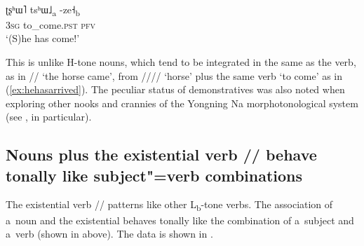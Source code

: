 \begin{exe}
	\ex
	\label{ex:hehasarrived}
	\\
	\gll ʈʂʰɯ˥ 	tsʰɯ˩\textsubscript{a}		-ze˧\textsubscript{b}\\
	3\textsc{sg}		to\_come.\textsc{pst}	\textsc{pfv}\\
	\glt ‘(S)he has come!’
\end{exe}

This is unlike H-tone nouns, which tend to be integrated in the same  as the verb, as in // ‘the horse came’, from //// ‘horse’ plus the same verb ‘to come’ as in (\ref{ex:hehasarrived}). The peculiar status of demonstratives was also noted when exploring other nooks and crannies of the Yongning Na morphotonological system (see , in particular).

\newpage 
\subsection[Noun plus existential verb behaves tonally like S+V]{Nouns plus the existential verb // behave tonally like subject"=verb combinations}
\label{sec:nounsplustheexistentialverbbehavetonallylikesubjectverbcombinations}

The existential verb // patterns like other L\textsubscript{b}-tone verbs. The association of a~noun and
the existential behaves tonally like the combination of a~subject and a~verb (shown in 
above). The data is shown in .

